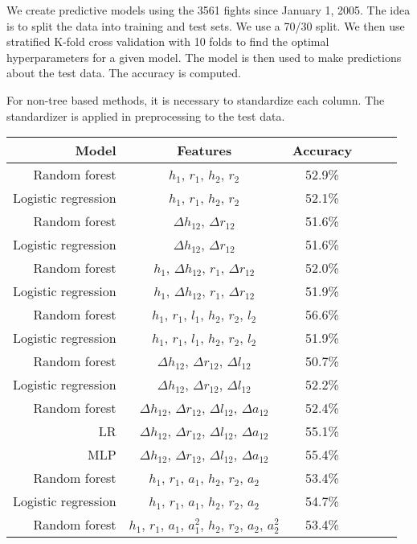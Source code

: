 We create predictive models using the 3561 fights since
January 1, 2005. The idea is to split the data into
training and test sets. We use a 70/30 split. We then
use stratified K-fold cross validation with 10 folds
to find the optimal
hyperparameters for a given model. The model is then
used to make predictions about the test data. The accuracy
is computed.

For non-tree based methods, it is necessary to standardize
each column. The standardizer is applied in preprocessing to
the test data.


\begin{center}
\begin{table}[h]
\begin{tabular}{r|ccccc}
  \toprule
  Model & Features & Accuracy\\
  \hline
  Random forest & $h_1$, $r_1$, $h_2$, $r_2$ & 52.9\% \\
  Logistic regression & $h_1$, $r_1$, $h_2$, $r_2$ & 52.1\% \\
  Random forest & $\Delta h_{12}$, $\Delta r_{12}$ & 51.6\% \\
  Logistic regression & $\Delta h_{12}$, $\Delta r_{12}$ & 51.6\% \\
  Random forest & $h_1$, $\Delta h_{12}$, $r_1$, $\Delta r_{12}$ & 52.0\% \\
  Logistic regression & $h_1$, $\Delta h_{12}$, $r_1$, $\Delta r_{12}$ & 51.9\% \\
  Random forest & $h_1$, $r_1$, $l_1$, $h_2$, $r_2$, $l_2$ & 56.6\% \\
  Logistic regression & $h_1$, $r_1$, $l_1$, $h_2$, $r_2$, $l_2$ & 51.9\% \\
  Random forest & $\Delta h_{12}$, $\Delta r_{12}$, $\Delta l_{12}$ & 50.7\% \\
  Logistic regression & $\Delta h_{12}$, $\Delta r_{12}$, $\Delta l_{12}$ & 52.2\% \\
  Random forest & $\Delta h_{12}$, $\Delta r_{12}$, $\Delta l_{12}$, $\Delta a_{12}$ & 52.4\% \\
  LR & $\Delta h_{12}$, $\Delta r_{12}$, $\Delta l_{12}$, $\Delta a_{12}$ & 55.1\% \\
  MLP & $\Delta h_{12}$, $\Delta r_{12}$, $\Delta l_{12}$, $\Delta a_{12}$ & 55.4\% \\
  Random forest & $h_1$, $r_1$, $a_1$, $h_2$, $r_2$, $a_2$ & 53.4\% \\
  Logistic regression & $h_1$, $r_1$, $a_1$, $h_2$, $r_2$, $a_2$ & 54.7\% \\
  Random forest & $h_1$, $r_1$, $a_1$, $a_1^2$, $h_2$, $r_2$, $a_2$, $a_2^2$ & 53.4\% \\

\end{tabular}
\end{table}
\end{center}
